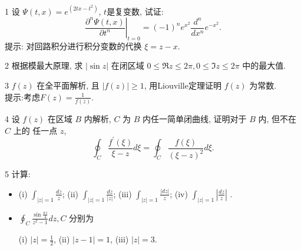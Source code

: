 \documentclass[11pt]{article}
\begin{document}
 

\begin{hwproblem}{1}
  设 $\Psi(t, x)=e^{ \left(2 t x-t^2\right)}$, $t$是复变数, 试证: 
  $$
  \left.\frac{\partial^n \Psi(t, x)}{\partial t^n}\right|_{t=0}=(-1)^n e^{x^2} \frac{d^n}{d x^n} e^{-x^2}.
  $$
  提示: 对回路积分进行积分变数的代换 $\xi=z-x$.
\end{hwproblem}

\vspace{0.5cm}

\begin{hwproblem}{2}
  根据模最大原理,
  求 $|\sin z|$ 在闭区域 $0 \leq \Re z \leq 2 \pi, 0 \leq \Im z \leq 2 \pi$ 中的最大值.
\end{hwproblem}

\vspace{0.5cm}

\begin{hwproblem}{3}
  $f(z)$ 在全平面解析, 且 $|f(z)| \geq 1$, 用Liouville定理证明 $f(z)$ 为常数.
  \\
  提示:考虑$F(z) = \frac{1}{f(z)}$.
\end{hwproblem}

\vspace{0.5cm}

\begin{hwproblem}{4}
  设 $f(z)$ 在区域 $B$ 内解析, $C$ 为 $B$ 内任一简单闭曲线, 证明对于 $B$ 内, 
  但不在 $C$ 上的 任一点 $z$, 
  $$
  \oint_C \frac{f^{\prime}(\xi)}{\xi-z} d \xi=\oint_C \frac{f(\xi)}{(\xi-z)^2} d \xi.
  $$ 
\end{hwproblem}

\vspace{0.5cm}

\begin{hwproblem}{5}
  计算:
  \begin{itemize}
    \item 
    (i) $\int_{|z|=1} \frac{d z}{z}$;
    (ii) $\int_{|z|=1} \frac{d z}{|z|}$;
    (iii) $\int_{|z|=1} \frac{|d z|}{z}$;
    (iv) $\int_{|z|=1}\left|\frac{d z}{z}\right|$ .

    \item  $\oint_C \frac{\sin \frac{\pi z}{4}}{z^2-1} d z, C$ 分别为

    (i) $|z|=\frac{1}{2}$,
    (ii) $|z-1|=1$,
    (iii) $|z|=3$.
    
  \end{itemize}
\end{hwproblem}
\end{document}
